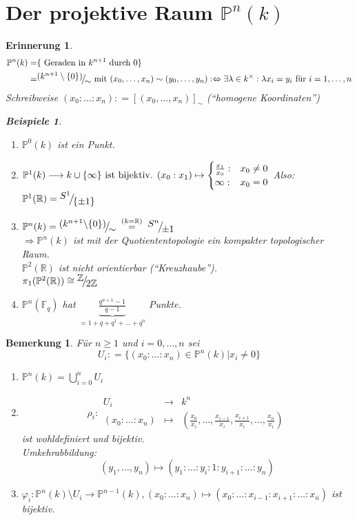 \documentclass[a4paper,12pt]{report}
\theoremstyle{break}
\newtheorem{Bem}[Def]{Bemerkung}
\theoremstyle{nonumberbreak}
\newtheorem{nnBsp}{Beispiele}
\newtheorem{Eri}{Erinnerung}
\theoremstyle{nonumberplain}
\newcommand{\defeqr}[0]{\mathrel{\mathop:}=}
\newcommand{\gleichwegen}[1]{\ensuremath{\DOTSB\;\stackrel{#1}{=}\;}}
\newcommand{\Abb}[5]{\ensuremath{#1:\begin{array}{ccc} #2 & \longrightarrow & #3 \\ #4 & \longmapsto & #5 \end{array}}}
\newcommand{\FakRaum}[2]{
  \raisebox{0.7ex}{\ensuremath{#1}}
  \ensuremath{\mkern-3mu}\big/\ensuremath{\mkern-3mu}
  \raisebox{-0.6ex}{\ensuremath{#2}}}
\begin{document}
\section{Der projektive Raum $\mathbb P^n(k)$}
\begin{Eri}
  \begin{align*}
  \mathbb P^n(k)=& \{ \text{ Geraden in $k^{n+1}$ durch $0$} \}     \\
 =&\FakRaum{(k^{n+1}\setminus\{0\})}{\sim}\text{ mit }(x_0,\dots,x_n)\sim(y_0,\dots,y_n):\Leftrightarrow\exists\lambda\in k^\times:\lambda x_i=y_i\text{ für } i=1,\dots,n
  \end{align*}
Schreibweise $(x_0:\dots:x_n)\defeqr [(x_0,\dots,x_n)]_\sim$ (``homogene Koordinaten'')
\begin{nnBsp}
  \begin{enumerate}
  \item[$n=0$:] $\mathbb P^0(k)$ ist ein Punkt.
  \item[$n=1$:]
 $\mathbb P^1(k)\longrightarrow  k \cup \{ \infty \} \text{ ist bijektiv. } \\
(x_0:x_1) \mapsto  
\begin{cases}
  \frac{x_1}{x_0}:&x_0\neq 0 \\
\infty:&x_0=0
\end{cases} $
Also: $\mathbb P^1(\mathbb R)=\FakRaum{S^1}{\{ \pm 1\} }$
\item [$k\in\{\mathbb R, \mathbb C\}:$] $\mathbb P^n(k)=\FakRaum{(k^{n+1}\backslash \{0\})}{\sim}\gleichwegen{(k=\mathbb R)}\FakRaum{S^n}{\pm 1}$ \\
$\Rightarrow\mathbb P^n(k)$ ist mit der Quotiententopologie ein kompakter topologischer Raum. \\
$\mathbb P^2(\mathbb R)$ ist nicht orientierbar (``Kreuzhaube''). \\
$\pi_1(\mathbb P^2(\mathbb R))\cong \FakRaum{\mathbb Z}{2\mathbb Z}$ 
\item[$k=\mathbb F_q$:] $\mathbb P^n(\mathbb F_q)$ hat $\underbrace{\frac{q^{n+1}-1}{q-1}}_{=1+q+q^1+\dots+q^n}$ Punkte.
  \end{enumerate}
\end{nnBsp}
\end{Eri}
\begin{Bem}
  Für $n\geq 1$ und $i=0,\dots,n$ sei 
\[
U_i\defeqr\{(x_0:\dots:x_n)\in\mathbb P^n(k)\vert x_i\neq 0 \}
\]
\begin{enumerate}
\item $\mathbb P^n(k)=\bigcup_{i=0}^n U_i$
\item \[
\Abb{\rho_i}{U_i}{k^n}{(x_0:\dots:x_n)}{(\frac{x_0}{x_i},\dots,\frac{x_{i-1}}{x_i},\frac{x_{i+1}}{x_i},\dots,\frac{x_n}{x_i})}
\]
ist wohldefiniert und bijektiv. \\ Umkehrabbildung: 
\[ 
(y_1,\dots,y_n)\mapsto (y_1:\dots:y_i:1:y_{i+1}:\dots:y_n)
\]

\item $\varphi_i:\mathbb P^n(k)\setminus U_i\longrightarrow \mathbb P^{n-1}(k),(x_0:\dots:x_n)\mapsto(x_0:\dots:x_{i-1}:x_{i+1}:\dots:x_n)$ ist bijektiv.
\end{enumerate}
\end{Bem}
\end{document}
